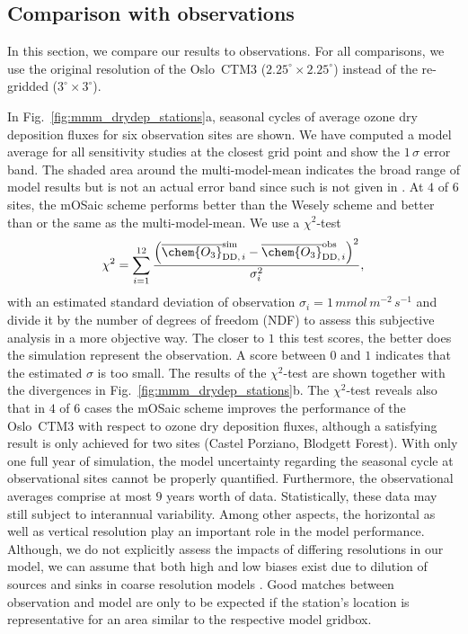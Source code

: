 \documentclass[gmd, manuscript]{copernicus}
\begin{document}
\subsection{Comparison with observations}
\label{subsec:obs}
In this section, we compare our results to observations. For all comparisons, we use the original resolution of the Oslo~CTM3 ($2.25^\circ\times 2.25^\circ$) instead of the re-gridded ($3^\circ\times 3^\circ$).

In Fig.~\ref{fig:mmm_drydep_stations}a, seasonal cycles of average ozone dry deposition fluxes for six observation sites are shown. We have computed a model average for all sensitivity studies at the closest grid point and show the $1\,\sigma$ error band. The shaded area around the multi-model-mean indicates the broad range of model results but is not an actual error band since such is not given in \citet{ACP:Hardacre2015}. At $4$ of $6$ sites, the mOSaic scheme performs better than the Wesely scheme and better than or the same as the multi-model-mean. We use a $\chi^2$-test
\begin{equation}
  \chi^2 = \sum_{i=1}^{12}\frac{\left(\overline{\chem{O_3}}_{\text{DD,\,}i}^\text{sim}-\overline{\chem{O_3}}_{\text{DD,\,}i}^\text{obs}\right)^2}{\sigma_i^2},
\end{equation}
with an estimated standard deviation of observation $\sigma_i=1\,\unit{mmol\,m^{-2}\,s^{-1}}$ and divide it by the number of degrees of freedom (NDF) to assess this subjective analysis in a more objective way. The closer to $1$ this test scores, the better does the simulation represent the observation. A score between $0$ and $1$ indicates that the estimated $\sigma$ is too small. The results of the $\chi^2$-test are shown together with the divergences in Fig.~\ref{fig:mmm_drydep_stations}b. The $\chi^2$-test reveals also that in $4$ of $6$ cases the mOSaic scheme improves the performance of the Oslo~CTM3 with respect to ozone dry deposition fluxes, although a satisfying result is only achieved for two sites (Castel Porziano, Blodgett Forest).
With only one full year of simulation, the model uncertainty regarding the seasonal cycle at observational sites cannot be properly quantified. Furthermore, the observational averages comprise at most $9$ years worth of data. Statistically, these data may still subject to interannual variability. Among other aspects, the horizontal as well as vertical resolution play an important role in the model performance. Although, we do not explicitly assess the impacts of differing resolutions in our model, we can assume that both high and low biases exist due to dilution of sources and sinks in coarse resolution models \citep{AE:Schaap2015}. Good matches between observation and model are only to be expected if the station's location is representative for an area similar to the respective model gridbox.
\end{document}
